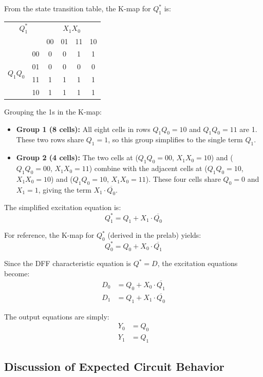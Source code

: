 \documentclass[12pt, letterpaper]{article}
\begin{document}
From the state transition table, the K-map for $Q_1^*$ is:

\begin{center}
  \begin{tabular}{|c|c|cccc|}
    \hline
    \multicolumn{2}{|c|}{$Q_1^*$} & \multicolumn{4}{c|}{$X_1X_0$} \\
    \multicolumn{2}{|c|}{} & 00 & 01 & 11 & 10 \\
    \hline
    \multirow{4}{*}{$Q_1Q_0$} & 00 & 0 & 0 & 1 & 1 \\
    & 01 & 0 & 0 & 0 & 0 \\
    & 11 & 1 & 1 & 1 & 1 \\
    & 10 & 1 & 1 & 1 & 1 \\
    \hline
  \end{tabular}
\end{center}

Grouping the 1s in the K-map:
\begin{itemize}
  \item \textbf{Group 1 (8 cells):} All eight cells in rows $Q_1Q_0 = 10$ and $Q_1Q_0 = 11$ are 1. These two rows share $Q_1 = 1$, so this group simplifies to the single term $Q_1$.
  \item \textbf{Group 2 (4 cells):} The two cells at ($Q_1Q_0 = 00$, $X_1X_0 = 10$) and ($Q_1Q_0 = 00$, $X_1X_0 = 11$) combine with the adjacent cells at ($Q_1Q_0 = 10$, $X_1X_0 = 10$) and ($Q_1Q_0 = 10$, $X_1X_0 = 11$). These four cells share $Q_0 = 0$ and $X_1 = 1$, giving the term $X_1 \cdot \overline{Q_0}$.
\end{itemize}

The simplified excitation equation is:
\[
  Q_1^* = Q_1 + X_1 \cdot \overline{Q_0}
\]

For reference, the K-map for $Q_0^*$ (derived in the prelab) yields:
\[
  Q_0^* = Q_0 + X_0 \cdot \overline{Q_1}
\]

Since the DFF characteristic equation is $Q^* = D$, the excitation equations become:
\begin{align*}
  D_0 &= Q_0 + X_0 \cdot \overline{Q_1} \\
  D_1 &= Q_1 + X_1 \cdot \overline{Q_0}
\end{align*}

The output equations are simply:
\begin{align*}
  Y_0 &= Q_0 \\
  Y_1 &= Q_1
\end{align*}

\subsection{Discussion of Expected Circuit Behavior}
\end{document}
